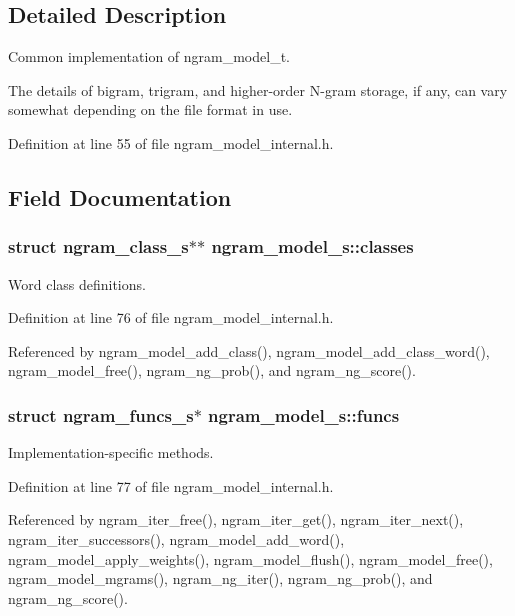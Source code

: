 \subsection{Detailed Description}
Common implementation of ngram\_\-model\_\-t. 

The details of bigram, trigram, and higher-order N-gram storage, if any, can vary somewhat depending on the file format in use. 

Definition at line 55 of file ngram\_\-model\_\-internal.h.

\subsection{Field Documentation}
\subsubsection[{classes}]{\setlength{\rightskip}{0pt plus 5cm}struct {\bf ngram\_\-class\_\-s}$\ast$$\ast$ {\bf ngram\_\-model\_\-s::classes}\hspace{0.3cm}{\tt  [read]}}\label{structngram__model__s_39384af3e6b53591d433436db011ac8d}


Word class definitions. 



Definition at line 76 of file ngram\_\-model\_\-internal.h.

Referenced by ngram\_\-model\_\-add\_\-class(), ngram\_\-model\_\-add\_\-class\_\-word(), ngram\_\-model\_\-free(), ngram\_\-ng\_\-prob(), and ngram\_\-ng\_\-score().
\subsubsection[{funcs}]{\setlength{\rightskip}{0pt plus 5cm}struct {\bf ngram\_\-funcs\_\-s}$\ast$ {\bf ngram\_\-model\_\-s::funcs}\hspace{0.3cm}{\tt  [read]}}\label{structngram__model__s_d3d9d8ad9773f958a89534220eda6fb9}


Implementation-specific methods. 



Definition at line 77 of file ngram\_\-model\_\-internal.h.

Referenced by ngram\_\-iter\_\-free(), ngram\_\-iter\_\-get(), ngram\_\-iter\_\-next(), ngram\_\-iter\_\-successors(), ngram\_\-model\_\-add\_\-word(), ngram\_\-model\_\-apply\_\-weights(), ngram\_\-model\_\-flush(), ngram\_\-model\_\-free(), ngram\_\-model\_\-mgrams(), ngram\_\-ng\_\-iter(), ngram\_\-ng\_\-prob(), and ngram\_\-ng\_\-score().

